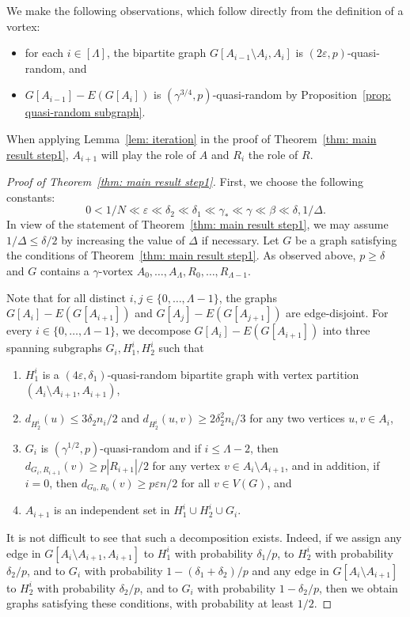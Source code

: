 \documentclass[a4paper, 11pt, reqno]{amsart}
\numberwithin{equation}{section}
\newcommand{\1}{{\rm 1\hspace*{-0.4ex}%
\rule{0.1ex}{1.52ex}\hspace*{0.2ex}}}
\renewcommand{\epsilon}{\varepsilon}
\newcommand{\sm}{\setminus}
\newcounter{step}
\begin{document}
We make the following observations, which follow directly from the definition of a vortex:
\begin{itemize}
	\item for each $i\in [\Lambda]$, the bipartite graph $G[A_{i-1}\sm A_i,A_i]$ is $(2\epsilon, p)$-quasi-random, and
	\item $G[A_{i-1}] -E(G[A_i])$ is $(\gamma^{3/4} ,p )$-quasi-random by Proposition~\ref{prop: quasi-random subgraph}. 
\end{itemize}
 

When applying Lemma~\ref{lem: iteration} in the proof of Theorem~\ref{thm: main result step1}, 
$A_{i+1}$ will play the role of $A$ and $R_i$ the role of $R$.

\begin{proof}[Proof of Theorem~\ref{thm: main result step1}]
First, we choose the following constants:
$$0<1/N \ll \epsilon \ll \delta_2 \ll \delta_1 \ll \gamma_*\ll \gamma \ll \beta \ll\delta,1/\Delta.$$
In view of the statement of Theorem~\ref{thm: main result step1}, 
we may assume $1/\Delta \leq \delta/2$ by increasing the value of $\Delta$ if necessary. Let $G$ be a graph satisfying the conditions of Theorem~\ref{thm: main result step1}.
As observed above, $p\geq \delta$ and $G$ contains a $\gamma$-vortex $A_0,\ldots, A_\Lambda, R_0,\ldots, R_{\Lambda-1}$.

Note that for all distinct $i,j\in \{0,\ldots,\Lambda-1\}$, 
the graphs $G[A_i] - E(G[A_{i+1}])$ and $G[A_j] - E(G[A_{j+1}])$ are edge-disjoint.
For every $i\in \{0,\ldots,\Lambda-1\}$, 
we decompose $G[A_i] - E(G[A_{i+1}])$ into three spanning  subgraphs $G_i, H^i_1, H^i_2$ such that 
\begin{enumerate}[label=(H\arabic*)$_i$]
\item\label{item:H1} $H^i_1$ is a $(4\epsilon,\delta_1)$-quasi-random bipartite graph with vertex partition $(A_{i}\setminus A_{i+1}, A_{i+1})$,
\item\label{item:H2} $d_{H^i_2}(u)\leq 3\delta_2 n_{i}/2$ and $d_{H^i_2}(u,v) \geq 2\delta_2^2 n_{i}/3$ for any two vertices $u,v\in A_{i}$,
\item\label{item:H3} $G_i$ is $(\gamma^{1/2},p)$-quasi-random and if $i\leq \Lambda-2$, then $d_{G_i,R_{i+1}}(v)\geq p|R_{i+1}|/2$ for any vertex $v \in A_i\setminus A_{i+1}$, and in addition, if $i=0$, then $d_{G_0,R_{0}}(v)\geq p\epsilon n/2$ for all $v\in V(G)$, and
\item\label{item:H4} $A_{i+1}$ is an independent set in $H_1^i\cup H^i_2\cup G_i$.
\end{enumerate}
It is not difficult to see that such a decomposition exists.
Indeed,
if we assign any edge in $G[A_{i}\setminus A_{i+1},A_{i+1}]$
to $H^i_1$ with probability $\delta_1/p$,
to $H^i_2$ with probability $\delta_2/p$, and
to $G_i$ with probability $1-(\delta_1+\delta_2)/p$
and any edge in $G[A_i\sm A_{i+1}]$
to $H^i_2$ with probability $\delta_2/p$, and
to $G_i$ with probability $1-\delta_2/p$,
then we obtain graphs
satisfying these conditions, with probability at least $1/2$.


\end{proof}
\end{document}
